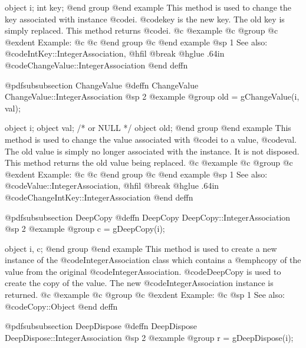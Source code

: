 object  i;
int     key;
@end group
@end example
This method is used to change the key associated with instance @code{i}.
@code{key} is the new key.  The old key is simply replaced.  This method
returns @code{i}.
@c @example
@c @group
@c @exdent Example:
@c 
@c @end group
@c @end example
@sp 1
See also:  @code{IntKey::IntegerAssociation,}
@hfil @break @hglue .64in      @code{ChangeValue::IntegerAssociation}
@end deffn











@pdfsubsubsection {ChangeValue}
@deffn {ChangeValue} ChangeValue::IntegerAssociation
@sp 2
@example
@group
old = gChangeValue(i, val);

object  i;
object  val;    /*  or NULL   */
object  old;
@end group
@end example
This method is used to change the value associated with
@code{i} to a value, @code{val}.  The old
value is simply no longer associated with the instance.  It is not
disposed.  This method returns the old value being replaced.
@c @example
@c @group
@c @exdent Example:
@c 
@c @end group
@c @end example
@sp 1
See also:  @code{Value::IntegerAssociation,}
@hfil @break @hglue .64in      @code{ChangeIntKey::IntegerAssociation}
@end deffn










@pdfsubsubsection {DeepCopy}
@deffn {DeepCopy} DeepCopy::IntegerAssociation
@sp 2
@example
@group
c = gDeepCopy(i);

object  i, c;
@end group
@end example
This method is used to create a new instance of the
@code{IntegerAssociation} class which contains a @emph{copy} of the value
from the original @code{IntegerAssociation}.  @code{DeepCopy} is used to
create the copy of the value.  The new @code{IntegerAssociation} instance
is returned.
@c @example
@c @group
@c @exdent Example:
@c 
@sp 1
See also:  @code{Copy::Object}
@end deffn













@pdfsubsubsection {DeepDispose}
@deffn {DeepDispose} DeepDispose::IntegerAssociation
@sp 2
@example
@group
r = gDeepDispose(i);

